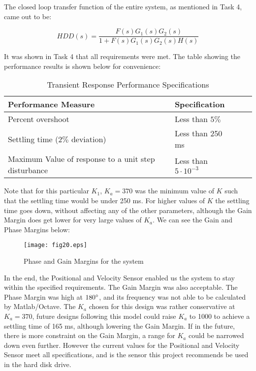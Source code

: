 \documentclass{article}
\newcommand{\matlab}[1]{%
%
}
\begin{document}
The closed loop transfer function of the entire system, as mentioned in Task 4,
came out to be:

$$HDD(s) = \frac{F(s)G_1(s)G_2(s)}{1 + F(s)G_1(s)G_2(s)H(s)}$$

It was shown in Task 4 that all requirements were met. The table showing the
performance results is shown below for convenience:

\begin{table}[H]
\begin{center}
  \begin{tabular}{ | l | l | l | p{5cm} |}
  \hline
  \textbf{Performance Measure} & \textbf{Specification}\\ \hline 
  Percent overshoot & Less than $5\%$ \\ \hline 
  Settling time ($2\%$ deviation) & Less than 250 ms \\ \hline 
  Maximum Value of response to a unit step disturbance & Less than 
  $5\cdot10^{-3}$ \\ \hline 
 \end{tabular}
\end{center}
\caption{Transient Response Performance Specifications}
\end{table}

Note that for this particular $K_1$, $K_a = 370$ was the minimum value of $K$
such that the settling time would be under 250 ms. For higher values of $K$ the
settling time goes down, without affecting any of the other parameters, although
the Gain Margin does get lower for very large values of $K_a$. We can see the
Gain and Phase Margins below:


\matlab{fig20.m}

\begin{figure}[H]
  \caption{Phase and Gain Margins for the system}
  \centering
  \texttt{[image: fig20.eps]}
\end{figure}

In the end, the Positional and Velocity Sensor enabled us the system to stay
within the specified requirements. The Gain Margin was also acceptable. The Phase
Margin was high at $180 \degree$, and its frequency was not able to be calculated
by Matlab/Octave. The $K_a$ chosen for this design was rather conservative at
$K_a = 370$, future designs following this model could raise $K_a$ to 1000 to
achieve a settling time of 165 ms, although lowering the Gain Margin. If in the
future, there is more constraint on the Gain Margin, a range for $K_a$ could be
narrowed down even further. However the current values for the Positional and
Velocity Sensor meet all specifications, and is the sensor this project
recommends be used in the hard disk drive.
\end{document}
